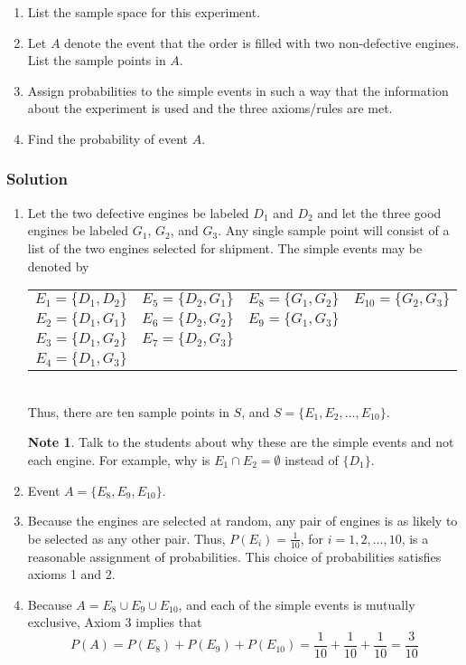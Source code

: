 \documentclass[11pt]{article}
\theoremstyle{definition}
\newtheorem{note}{Note}
\begin{document}
\begin{enumerate}
	\item List the sample space for this experiment.
	\item Let $A$ denote the event that the order is filled with two non-defective engines. List the sample points in $A$.
	\item Assign probabilities to the simple events in such a way that the information about the experiment is used and the three axioms/rules are met.
	\item Find the probability of event $A$.
\end{enumerate}

\subsubsection*{Solution}

\begin{enumerate}
	\item Let the two defective engines be labeled $D_1$ and $D_2$ and let the three good engines be labeled $G_1$, $G_2$, and $G_3$. Any single sample point will consist of a list of the two engines selected for shipment. The simple events may be denoted by \\
	\begin{tabular}{cccc}
		$E_1 = \{D_1, D_2\}$ & $E_5 = \{D_2, G_1\}$ & $E_8 = \{G_1, G_2\}$ & $E_{10} = \{G_2, G_3\}$  \\
		$E_2 = \{D_1, G_1\}$ & $E_6 = \{D_2, G_2\}$ & $E_9 = \{G_1, G_3\}$ &  \\
		$E_3 = \{D_1, G_2\}$ & $E_7 = \{D_2, G_3\}$ &  &  \\
		$E_4 = \{D_1, G_3\}$ &  &  &  \\
	\end{tabular} \\
	Thus, there are ten sample points in $S$, and $S = \{E_1, E_2, \ldots, E_{10}\}$.
	\begin{note}
		Talk to the students about why these are the simple events and not each engine. For example, why is $E_1 \cap E_2 = \emptyset$ instead of $\{D_1\}$.
	\end{note}
	\item Event $A = \{E_8, E_9, E_{10}\}$.
	\item Because the engines are selected at random, any pair of engines is as likely to be selected as any other pair. Thus, $P(E_i) = \frac{1}{10}$, for $i=1, 2, \ldots, 10$, is a reasonable assignment of probabilities. This choice of probabilities satisfies axioms 1 and 2.
	\item Because $A = E_8 \cup E_9 \cup E_{10}$, and each of the simple events is mutually exclusive, Axiom 3 implies that
	$$
		P(A) = P(E_8) + P(E_9) + P(E_{10}) = \frac{1}{10} + \frac{1}{10} + \frac{1}{10} = \frac{3}{10}
	$$
\end{enumerate}
\end{document}

